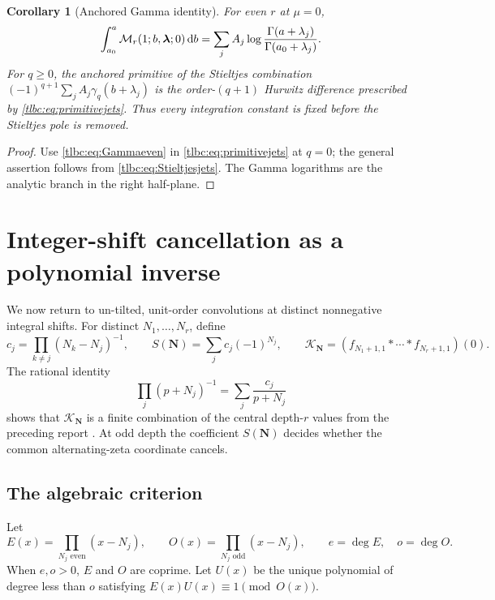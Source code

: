 \documentclass[11pt,letterpaper]{article}
\numberwithin{equation}{section}
\newtheorem{corollary}[theorem]{Corollary}
\theoremstyle{definition}\newtheorem{definition}[theorem]{Definition}
\theoremstyle{remark}\newtheorem{remark}[theorem]{Remark}
\newcommand{\dd}{\,\mathrm d}\newcommand{\ii}{\mathrm i}
\newcommand{\M}{\mathcal M}\newcommand{\T}{\mathcal T}\newcommand{\K}{\mathcal K}
\begin{document}
\begin{corollary}[Anchored Gamma identity]\label{tlbc:cor:GammaPrimitive}
For even $r$ at $\mu=0$,
\begin{equation}\label{tlbc:eq:GammaPrimitive}
 \int_{a_0}^a\M_r(1;b,\bl;0)\dd b
 =\sum_j A_j\log\frac{\Gamma(a+\lambda_j)}{\Gamma(a_0+\lambda_j)}.
\end{equation}
For $q\ge0$, the anchored primitive of the Stieltjes combination
$(-1)^{q+1}\sum_jA_j\gamma_q(b+\lambda_j)$ is the order-$(q+1)$ Hurwitz difference prescribed by \eqref{tlbc:eq:primitivejets}. Thus every integration constant is fixed before the Stieltjes pole is removed.
\end{corollary}
\begin{proof}
Use \eqref{tlbc:eq:Gammaeven} in \eqref{tlbc:eq:primitivejets} at $q=0$; the general assertion follows from \eqref{tlbc:eq:Stieltjesjets}. The Gamma logarithms are the analytic branch in the right half-plane.
\end{proof}

\section{Integer-shift cancellation as a polynomial inverse}
\label{tlbc:sec:binary}
We now return to un-tilted, unit-order convolutions at distinct nonnegative integral shifts. For distinct $N_1,\ldots,N_r$, define
\begin{equation}\label{tlbc:eq:lattice}
 c_j=\prod_{k\ne j}(N_k-N_j)^{-1},\qquad
 S(\boldsymbol N)=\sum_jc_j(-1)^{N_j},\qquad
 \K_{\boldsymbol N}=(f_{N_1+1,1}*\cdots*f_{N_r+1,1})(0).
\end{equation}
The rational identity
\begin{equation}\label{tlbc:eq:latticePF}
 \prod_j(p+N_j)^{-1}=\sum_j\frac{c_j}{p+N_j}
\end{equation}
shows that $\K_{\boldsymbol N}$ is a finite combination of the central depth-$r$ values from the preceding report \cite{RLC}. At odd depth the coefficient $S(\boldsymbol N)$ decides whether the common alternating-zeta coordinate cancels.

\subsection{The algebraic criterion}
Let
\begin{equation}\label{tlbc:eq:EO}
 E(x)=\prod_{N_j\text{ even}}(x-N_j),\qquad
 O(x)=\prod_{N_j\text{ odd}}(x-N_j),\qquad
 e=\deg E,\quad o=\deg O.
\end{equation}
When $e,o>0$, $E$ and $O$ are coprime. Let $U(x)$ be the unique polynomial of degree less than $o$ satisfying $E(x)U(x)\equiv1\pmod{O(x)}$.
\end{document}
